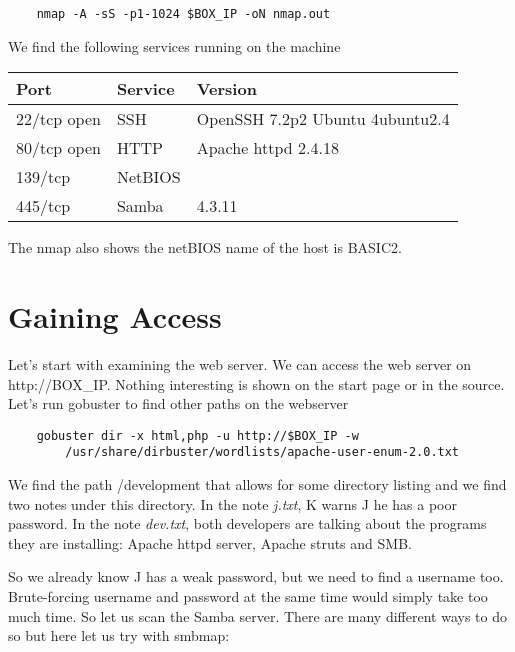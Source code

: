 \documentclass{article}
\begin{document}
\begin{lstlisting}
    nmap -A -sS -p1-1024 $BOX_IP -oN nmap.out
\end{lstlisting}

We find the following services running on the machine

\begin{table}[h]
\begin{tabular}{|l|l|l|}
\hline
\rowcolor[HTML]{9B9B9B} 
\textbf{Port} & \textbf{Service} & \textbf{Version}                                             \\ \hline
22/tcp open  & SSH            & OpenSSH 7.2p2 Ubuntu 4ubuntu2.4                                       \\ \hline
80/tcp open  & HTTP    & Apache httpd 2.4.18                         \\ \hline
139/tcp & NetBIOS & \\ \hline
445/tcp & Samba & 4.3.11 \\ \hline
\end{tabular}
\end{table}

The nmap also shows the netBIOS name of the host is BASIC2.

\section*{Gaining Access}
Let's start with examining the web server. We can access the web server on http://BOX\_IP. Nothing interesting is shown on the start page or in the source. Let's run gobuster to find other paths on the webserver 

\begin{lstlisting}
    gobuster dir -x html,php -u http://$BOX_IP -w 
        /usr/share/dirbuster/wordlists/apache-user-enum-2.0.txt
\end{lstlisting}

We find the path /development that allows for some directory listing and we find two notes under this directory. In the note \textit{j.txt}, K warns J he has a poor password. In the note \textit{dev.txt}, both developers are talking about the programs they are installing: Apache httpd server, Apache struts and SMB. 

\vspace{3mm}

So we already know J has a weak password, but we need to find a username too. Brute-forcing username and password at the same time would simply take too much time. So let us scan the Samba server. There are many different ways to do so but here let us try with smbmap:
\end{document}
